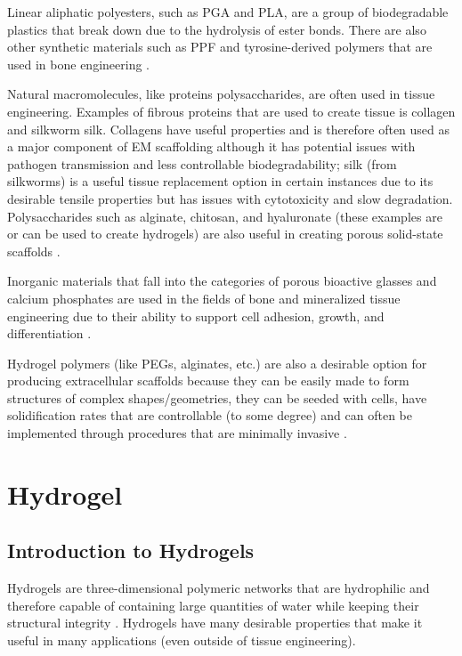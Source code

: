 Linear aliphatic polyesters, such as PGA and PLA, are a group of biodegradable plastics that break down due to the hydrolysis of ester bonds. There are also other synthetic materials such as PPF and tyrosine-derived polymers that are used in bone engineering \citep{mapx2004}.

Natural macromolecules, like proteins polysaccharides, are often used in tissue engineering. Examples of fibrous proteins that are used to create tissue is collagen and silkworm silk. Collagens have useful properties and is therefore often used as a major component of EM scaffolding although it has potential issues with pathogen transmission and less controllable biodegradability; silk (from silkworms) is a useful tissue replacement option in certain instances due to its desirable tensile properties but has issues with cytotoxicity and slow degradation. Polysaccharides such as alginate, chitosan, and hyaluronate (these examples are or can be used to create hydrogels) are also useful in creating porous solid-state scaffolds \citep{mapx2004}.

Inorganic materials that fall into the categories of porous bioactive glasses and calcium phosphates are used in the fields of bone and mineralized tissue engineering due to their ability to support cell adhesion, growth, and differentiation \citep{mapx2004}.

Hydrogel polymers (like PEGs, alginates, etc.) are also a desirable option for producing extracellular scaffolds because they can be easily made to form structures of complex shapes/geometries, they can be seeded with cells, have solidification rates that are controllable (to some degree) and can often be implemented through procedures that are minimally invasive \citep{mapx2004}.

\section{Hydrogel}

\subsection{Introduction to Hydrogels}
Hydrogels are three-dimensional polymeric networks that are hydrophilic and therefore capable of containing large quantities of water while keeping their structural integrity \citep{peppas_2000}. Hydrogels have many desirable properties that make it useful in many applications (even outside of tissue engineering).

